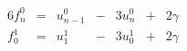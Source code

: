 \begin{alignat*}{6}
f_{n}^0 & {}={} & u_{n-1}^0 & {}-{} & 3u_{n}^0 & {}+{} &  2\gamma \\
f_{0}^1 & {}={} & u_{1}^1 & {}-{} & 3u_{0}^1 & {}+{} &  2\gamma
\end{alignat*}